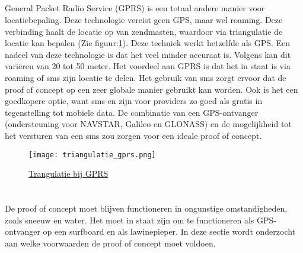 \subsection{}
General Packet Radio Service (GPRS) is een totaal andere manier voor locatiebepaling. Deze technologie vereist geen GPS, maar wel roaming. Deze verbinding haalt de locatie op van zendmasten, waardoor via triangulatie de locatie kan bepalen (Zie figuur:\ref{fig:triangulatie_gprs}). Deze techniek werkt hetzelfde als GPS.
\newline
Een nadeel van deze technologie is dat het veel minder accuraat is. Volgens \cite{gprs} kan dit variëren van 20 tot 50 meter. Het voordeel aan GPRS is dat het in staat is via roaming of sms zijn locatie te delen. Het gebruik van sms zorgt ervoor dat de proof of concept op een zeer globale manier gebruikt kan worden. Ook is het een goedkopere optie, want sms-en zijn voor providers zo goed als gratis in tegenstelling tot mobiele data. De combinatie van een GPS-ontvanger (ondersteuning voor NAVSTAR, Galileo en GLONASS) en de mogelijkheid tot het versturen van een sms zou zorgen voor een ideale proof of concept. 
\begin{figure}
    \texttt{[image: triangulatie\_gprs.png]}
    \caption{\href{http://bigpicturequestions.com/how-does-triangulation-help-our-evolution/}{Trangulatie bij GPRS}}
    \label{fig:triangulatie_gprs}
\end{figure}
\pagebreak
\raggedbottom
\section{}
De proof of concept moet blijven functioneren in ongunstige omstandigheden, zoals sneeuw en water. Het moet in staat zijn om te functioneren als GPS-ontvanger op een surfboard en als lawinepieper. In deze sectie wordt onderzocht aan welke voorwaarden de proof of concept moet voldoen.
